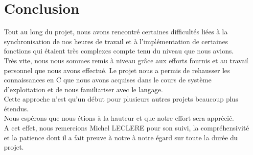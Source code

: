 \chapter{Conclusion}
Tout au long du projet, nous avons rencontré certaines difficultés liées à la synchronisation de nos heures de travail et à l'implémentation de certaines fonctions qui étaient très complexes compte tenu du niveau que nous avions.\\

Très vite, nous nous sommes remis à niveau grâce aux efforts fournis et au travail personnel que nous avons effectué. 
Le projet nous a permis de rehausser les connaissances en C que nous avons acquises dans le cours de système d'exploitation et de nous familiariser avec le langage.\\

Cette approche n’est qu’un début pour plusieurs autres projets beaucoup plus étendus.\\ 

Nous espérons que nous étions à la hauteur et que notre effort sera apprécié.\\
A cet effet, nous remercions Michel LECLERE pour son suivi, la compréhensivité et la patience dont il a fait preuve à notre à notre égard sur toute la durée du projet.

